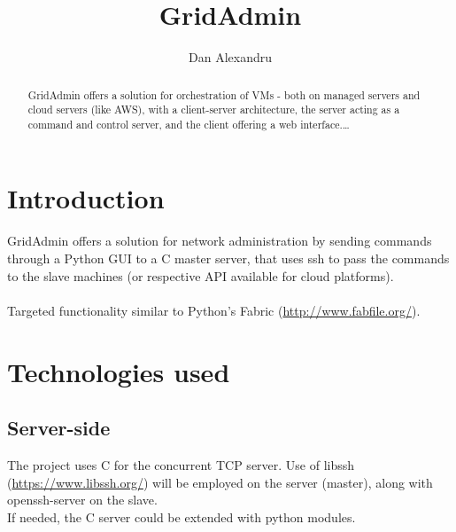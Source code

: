\documentclass{llncs}
\begin{document}
\title{GridAdmin}
%
\author{Dan Alexandru}
%
%
%

\maketitle              %
%


%
\begin{abstract}
GridAdmin offers a solution for orchestration of VMs - both on managed servers and cloud servers (like AWS), with a client-server architecture, the server acting as a command and control server, and the client offering a web interface.\dots
{}
\end{abstract}
%

\section{Introduction}
%
GridAdmin offers a solution for network administration by sending commands through a Python GUI to a C master server, that uses ssh to pass the commands to the slave machines (or respective API available for cloud platforms).
\\\\
Targeted functionality similar to Python's Fabric (\url{http://www.fabfile.org/}).

%
\section{Technologies used}
%

\subsection{Server-side}

The project uses C for the concurrent TCP server. Use of libssh (\url{https://www.libssh.org/}) will be employed on the server (master), along with openssh-server on the slave.\\
If needed, the C server could be extended with python modules.
\end{document}
